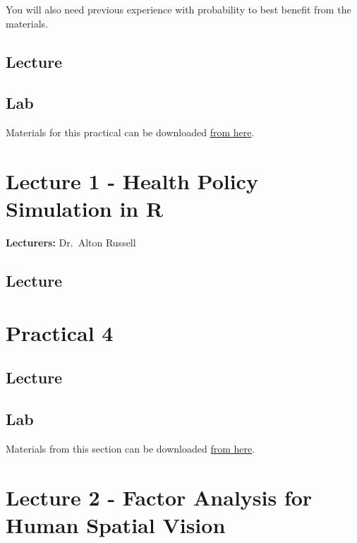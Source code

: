 \documentclass[
]{book}
\begin{document}
You will also need previous experience with probability to best benefit from the materials.

\section{Lecture}\label{lecture-2}

\section{Lab}\label{lab-2}

Materials for this practical can be downloaded \href{https://github.com/AudreyBaguette/CBW25_Introduction-to-Statistics-in-R}{from here}.

\chapter{Lecture 1 - Health Policy Simulation in R}\label{lecture-1---health-policy-simulation-in-r}

\textbf{Lecturers:} Dr.~Alton Russell

\section{Lecture}\label{lecture-3}

\chapter{Practical 4}\label{practical-4}

\section{Lecture}\label{lecture-4}

\section{Lab}\label{lab-3}

Materials from this section can be downloaded \href{https://github.com/Hannah-Yu-0816/CBH_Workshop_Practial4_DataVisualization}{from here}.

\chapter{Lecture 2 - Factor Analysis for Human Spatial Vision}\label{lecture-2---factor-analysis-for-human-spatial-vision}
\end{document}
